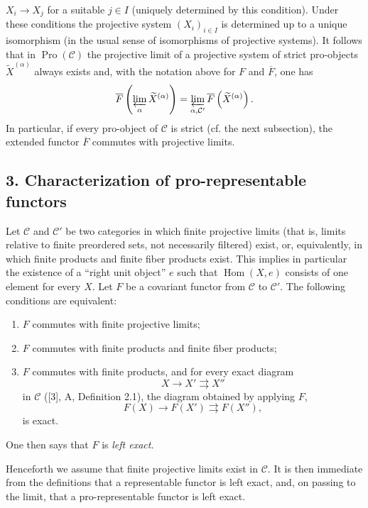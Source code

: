 $X_i\longrightarrow X_j$ for a suitable $j\in I$ (uniquely determined by this
condition). Under these conditions the projective system $(X_i)_{i\in I}$ is
determined up to a unique isomorphism (in the usual sense of isomorphisms of
projective systems). It follows that in $\operatorname{Pro}(\mathcal C)$ the
projective limit of a projective system of strict pro-objects
$\widetilde X^{(\alpha)}$ always exists and, with the notation above for $F$
and $\overline F$, one has
\[
  \overline F\left(\varprojlim_\alpha\widetilde X^{(\alpha)}\right)
  =\varprojlim_{\alpha,\mathcal C'}
  \overline F\left(\widetilde X^{(\alpha)}\right).
\]
In particular, if every pro-object of $\mathcal C$ is strict (cf. the next
subsection), the extended functor $\overline F$ commutes with projective
limits.

\subsection*{3. Characterization of pro-representable functors}

Let $\mathcal C$ and $\mathcal C'$ be two categories in which finite
projective limits (that is, limits relative to finite preordered sets, not
necessarily filtered) exist, or, equivalently, in which finite products and
finite fiber products exist. This implies in particular the existence of a
“right unit object” $e$ such that $\operatorname{Hom}(X,e)$ consists of one
element for every $X$. Let $F$ be a covariant functor from $\mathcal C$ to
$\mathcal C'$. The following conditions are equivalent:

\begin{enumerate}
\item[(i)] $F$ commutes with finite projective limits;
\item[(ii)] $F$ commutes with finite products and finite fiber products;
\item[(iii)] $F$ commutes with finite products, and for every exact diagram
\[
  X\longrightarrow X'\rightrightarrows X''
\]
in $\mathcal C$ ([3], A, Definition 2.1), the diagram obtained by applying $F$,
\[
  F(X)\longrightarrow F(X')\rightrightarrows F(X''),
\]
is exact.
\end{enumerate}

One then says that $F$ is \emph{left exact}.

Henceforth we assume that finite projective limits exist in $\mathcal C$. It
is then immediate from the definitions that a representable functor is left
exact, and, on passing to the limit, that a pro-representable functor is left
exact.

